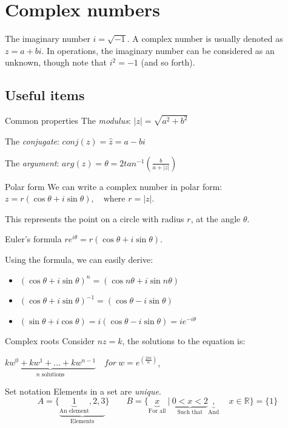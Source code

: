 \documentclass{article}
\begin{document}
\section{Complex numbers}
The imaginary number $i=\sqrt{-1}$. A complex number is usually denoted as $z=a+bi$. In operations, the imaginary number can be considered as an unknown, though note that $i^2=-1$ (and so forth).
\subsection{Useful items}
\begin{propBox}[]{Common properties}
    The \emph{modulus}: $|z|=\sqrt{a^2+b^2}$

    The \emph{conjugate}: $conj(z) = \hat{z} = a-bi$

    The \emph{argument}: $arg(z) = \theta = 2tan^{-1}(\frac{b}{a+|z|})$
\end{propBox}

\begin{knBox}[]{Polar form}
    We can write a complex number in polar form: $z=r(\cos\theta+i\sin\theta),\quad \text{where } r=|z|$.

    This represents the point on a circle with radius $r$, at the angle $\theta$.
\end{knBox}

\begin{knBox}[]{Euler's formula}
    $re^{i\theta}=r(\cos\theta+i\sin\theta)$.

    Using the formula, we can easily derive:
    \begin{itemize}
        \item $(\cos\theta+i\sin\theta)^n = (\cos{n\theta}+i\sin{n\theta})$
        \item $(\cos\theta+i\sin\theta)^{-1} = (\cos{\theta}-i\sin{\theta})$
        \item $(\sin\theta+i\cos\theta) = i(\cos{\theta}-i\sin{\theta})=ie^{-i\theta}$
    \end{itemize}
\end{knBox}

\begin{propBox}[]{Complex roots}
    Consider $nz=k$, the solutions to the equation is:
    
    $\underbrace{kw^0 + kw^1 + \dots + kw^{n-1}}_{n\text{ solutions}}\quad for\ w = e^(\frac{2\pi i}{n})$, 
\end{propBox}

\begin{knBox}[]{Set notation}
    Elements in a set are \emph{unique}.
    \[A=\{\underbrace{\underbrace{1}_{\text{An element}},2,3}_{\text{Elements}}\}\quad\quad B=\{\underbrace{x}_{\text{For all}}\ |\ \underbrace{0<x<2}_{\text{Such that}}\underbrace{,}_{\text{And}}\quad x\in\mathds{R}\}=\{1\}\]
\end{knBox}
\end{document}
